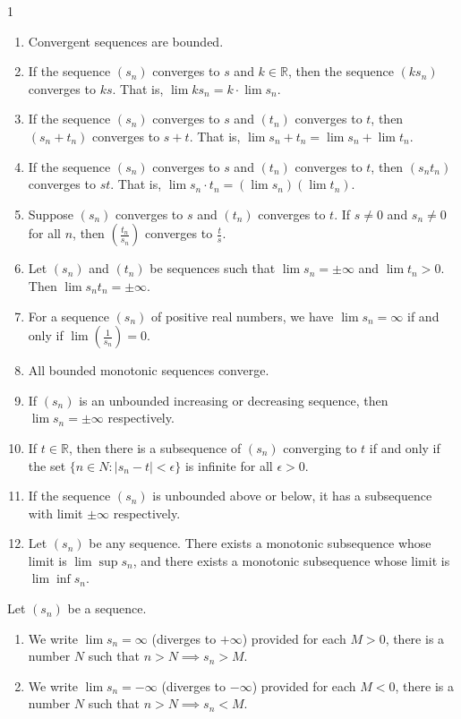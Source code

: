 \begin{theo}{1}
	\begin{enumerate}[i]
		\item Convergent sequences are bounded.
		\item If the sequence $(s_n)$ converges to $s$ and $k\in\mathbb{R}$, then the sequence $(ks_n)$ converges to $ks$. That is, $\lim ks_n=k\cdot \lim s_n$.
		\item If the sequence $(s_n)$ converges to $s$ and $(t_n)$ converges to $t$, then $(s_n+t_n)$ converges to $s+t$. That is, $\lim s_n+t_n=\lim s_n+\lim t_n$.
		\item If the sequence $(s_n)$ converges to $s$ and $(t_n)$ converges to $t$, then $(s_n t_n)$ converges to $st$. That is, $\lim s_n\cdot t_n=(\lim s_n)(\lim t_n)$.
		\item Suppose $(s_n)$ converges to $s$ and $(t_n)$ converges to $t$. If $s \neq 0$ and
		$s_n \neq 0$ for all $n$, then $(\frac{t_n}{s_n})$ converges to $\frac{t}{s}$.		
		\item Let $(s_n)$ and $(t_n)$ be sequences such that $\lim s_n=\pm\infty$ and $\lim t_n > 0$. Then $\lim s_n t_n = \pm\infty$.
		\item For a sequence $(s_n)$ of positive real numbers, we have $\lim s_n = \infty$
		if and only if $\lim(\frac{1}{s_n}) = 0$.
		\item All bounded monotonic sequences converge.
		\item If $(s_n)$ is an unbounded increasing or decreasing sequence, then $\lim s_n = \pm\infty$ respectively.
		\item If $t \in \mathbb{R}$, then there is a subsequence of $(s_n)$ converging to $t$ if and only if the set $\{n \in N : |s_n − t| < \epsilon\}$ is infinite for all $\epsilon > 0$.
		\item If the sequence $(s_n)$ is unbounded above or below, it has a subsequence with limit $\pm \infty$ respectively.
		\item Let $(s_n)$ be any sequence. There exists a monotonic subsequence	whose limit is $\lim \sup s_n$, and there exists a monotonic subsequence	whose limit is $\lim \inf s_n$.
	\end{enumerate}
\end{theo}


\begin{defn}{1}
	Let $(s_n)$ be a sequence.
	\begin{enumerate}[i]
		\item We write $\lim s_n = \infty$ (diverges to $+\infty$) provided for each $M>0$, there is a number $N$ such that $n>N \implies s_n>M$.
		\item We write $\lim s_n = -\infty$ (diverges to $-\infty$) provided for each $M<0$, there is a number $N$ such that $n>N \implies s_n<M$.
	\end{enumerate}	
\end{defn}

